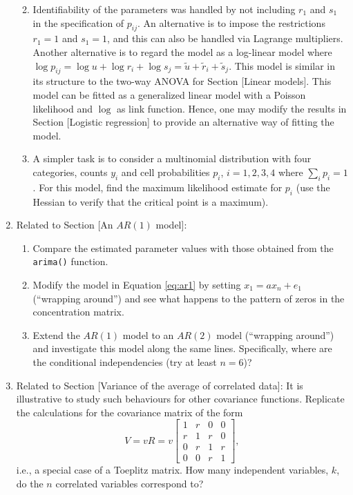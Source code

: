 \begin{enumerate}
  \begin{enumerate}
  \def\labelenumii{\alph{enumii})}
  \tightlist
  \item
    Identifiability of the parameters was handled by not including
    \(r_1\) and \(s_1\) in the specification of \(p_{ij}\). An alternative is
    to impose the restrictions \(r_1=1\) and \(s_1=1\), and this can also
    be handled via Lagrange multipliers. Another alternative is to regard
    the model as a log-linear model where \(\log p_{ij} = \log u + \log r_i + \log s_j = \tilde{u} + \tilde{r}_i + \tilde{s}_j\). This model
    is similar in its structure to the two-way ANOVA for Section {[}Linear
    models{]}. This model can be fitted as a generalized linear model
    with a Poisson likelihood and \(\log\) as link function. Hence, one
    may modify the results in Section {[}Logistic regression{]} to
    provide an alternative way of fitting the model.
  \item
    A simpler task is
    to consider a multinomial distribution with four categories,
    counts \(y_i\) and cell probabilities \(p_i\), \(i=1,2,3,4\) where \(\sum_i p_i=1\). For this model, find the maximum likelihood estimate for
    \(p_i\) (use the Hessian to verify that the critical point is a maximum).
  \end{enumerate}
\item
  Related to Section {[}An \(AR(1)\) model{]}:

  \begin{enumerate}
  \def\labelenumii{\alph{enumii})}
  \tightlist
  \item
    Compare the estimated parameter values with those obtained from
    the \texttt{arima()} function.
  \item
    Modify the model in Equation \eqref{eq:ar1} by
    setting \(x_1 = a x_n + e_1\) (``wrapping around'') and see what happens
    to the pattern of zeros in the concentration matrix.
  \item
    Extend the
    \(AR(1)\) model to an \(AR(2)\) model (``wrapping around'') and
    investigate this model along the same lines. Specifically,
    where are the conditional independencies (try at least \(n=6\))?
  \end{enumerate}
\item
  Related to Section {[}Variance of the average of correlated data{]}: It
  is illustrative to study such behaviours for other covariance
  functions.
  Replicate the calculations for the covariance matrix of the form
  \begin{equation}
    \label{eq:ex5}
    V = v R = v \left[\begin{matrix}1 & r & 0 & 0\\r & 1 & r & 0\\0 & r & 1 & r\\0 & 0 & r & 1\end{matrix}\right],
  \end{equation}
  i.e., a special case of a Toeplitz matrix.
  How many independent variables, \(k\), do
  the \(n\) correlated variables correspond to?
\end{enumerate}

